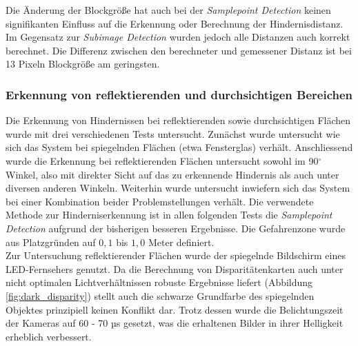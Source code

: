 \noindent
Die Änderung der Blockgröße hat auch bei der \emph{Samplepoint Detection} keinen signifikanten Einfluss auf die Erkennung oder Berechnung der Hindernisdistanz. Im Gegensatz zur \emph{Subimage Detection} wurden jedoch alle Distanzen auch korrekt berechnet. Die Differenz zwischen den berechneter und gemessener Distanz ist bei 13 Pixeln Blockgröße am geringsten.


\subsubsection{Erkennung von reflektierenden und durchsichtigen Bereichen}
\label{subsec:test_reflection_translucency}

Die Erkennung von Hindernissen bei reflektierenden sowie durchsichtigen \linebreak Flächen wurde mit drei verschiedenen Tests untersucht. Zunächst wurde untersucht wie sich das System bei spiegelnden Flächen (etwa Fensterglas) verhält. Anschliessend wurde die Erkennung bei reflektierenden Flächen untersucht sowohl im 90$^\circ$ Winkel, also mit direkter Sicht auf das zu erkennende Hindernis als auch unter diversen anderen Winkeln. Weiterhin wurde untersucht inwiefern sich das System bei einer Kombination beider Problemstellungen verhält. Die verwendete Methode zur Hinderniserkennung ist in allen folgenden Tests die \emph{Samplepoint Detection} aufgrund der bisherigen besseren Ergebnisse. Die Gefahrenzone wurde aus Platzgründen auf $0,1$ bis $1,0$ Meter definiert.\\

\noindent
Zur Untersuchung reflektierender Flächen wurde der spiegelnde Bildschirm eines LED-Fernsehers genutzt. Da die Berechnung von Disparitätenkarten auch unter nicht optimalen Lichtverhältnissen robuste Ergebnisse liefert (Abbildung \ref{fig:dark_disparity}) stellt auch die schwarze Grundfarbe des spiegelnden Objektes prinzipiell keinen Konflikt dar. Trotz dessen wurde die Belichtungszeit der Kameras auf 60 - 70 µs gesetzt, was die erhaltenen Bilder in ihrer Helligkeit erheblich verbessert.\\


